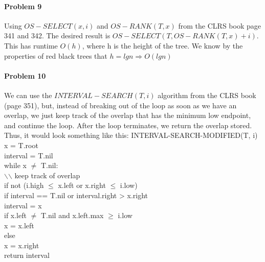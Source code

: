 \documentclass[11pt]{article}
\begin{document}
\paragraph{\noindent\textbf{\LARGE{Problem 9}}}
\begin{flushleft}
    Using $OS-SELECT(x,i)$ and $OS-RANK(T,x)$ from the CLRS book page 341 and 342.
    The desired result is $OS-SELECT(T, OS-RANK(T, x) + i)$. 
    This has runtime $O(h)$, where h is the height of the tree. We know by the properties of red black trees that
    $h = lgn \Rightarrow O(lgn)$
\end{flushleft}

\paragraph{\noindent\textbf{\LARGE{Problem 10}}}
\begin{flushleft}
    We can use the $INTERVAL-SEARCH(T,i)$ algorithm from the CLRS book (page 351), 
    but, instead of breaking out of the loop as soon as we have an overlap, we just keep track of the overlap that has the minimum low endpoint, and continue the loop. After the loop terminates, we return the overlap stored.
    \newline
    \newline
    Thus, it would look something like this:
    \newline
    \newline
    INTERVAL-SEARCH-MODIFIED(T, i) \\
    x = T.root \\
    interval = T.nil \\
    while x $\neq$ T.nil:\\
    \quad $\backslash$$\backslash$ keep track of overlap \\
    \quad if not (i.high $\leq$ x.left or x.right $\leq$ i.low) \\
    \quad \quad if interval == T.nil or interval.right > x.right \\
    \quad \quad \quad interval = x \\
    \quad if x.left $\neq$ T.nil and x.left.max $\geq$ i.low \\
    \quad \quad x = x.left\\
    \quad else \\
    \quad \quad x = x.right\\
   return interval    
\end{flushleft}
\end{document}
